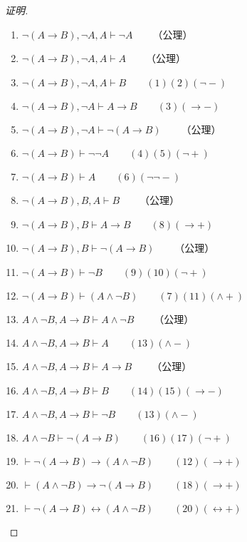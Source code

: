 \documentclass{article}
\begin{document}
\begin{CJK*}{UTF8}{gbsn}
\begin{proof}[证明]
      \begin{enumerate}
        \item $\lnot(A\to B), \lnot A, A\vdash \lnot A\qquad $（公理）
        \item $\lnot(A\to B), \lnot A, A\vdash A\qquad $（公理）
        \item $\lnot(A\to B), \lnot A, A\vdash B\qquad (1)(2)(\lnot -)$
        \item $\lnot(A\to B), \lnot A\vdash A\to B\qquad (3)(\to -)$
        \item $\lnot(A\to B), \lnot A\vdash \lnot(A\to B)\qquad $（公理）
        \item $\lnot(A\to B)\vdash \lnot\lnot A\qquad (4)(5)(\lnot +)$
        \item $\lnot(A\to B)\vdash A\qquad (6)(\lnot\lnot-)$
        \item $\lnot(A\to B), B, A\vdash B \qquad $（公理）
        \item $\lnot(A\to B), B\vdash A\to B \qquad (8)(\to +)$
        \item $\lnot(A\to B), B\vdash \lnot(A\to B) \qquad $（公理）
        \item $\lnot(A\to B)\vdash \lnot B \qquad (9)(10)(\lnot +)$
        \item $\lnot(A\to B)\vdash (A\land \lnot B) \qquad (7)(11)(\land +)$
        \item $A\land \lnot B, A\to B\vdash A\land \lnot B\qquad$（公理）
        \item $A\land \lnot B, A\to B\vdash A\qquad(13)(\land -)$
        \item $A\land \lnot B, A\to B\vdash A\to B\qquad$（公理）
        \item $A\land \lnot B, A\to B\vdash B\qquad(14)(15)(\to -)$
        \item $A\land \lnot B, A\to B\vdash \lnot B\qquad(13)(\land -)$
        \item $A\land \lnot B\vdash \lnot(A\to B) \qquad(16)(17)(\lnot +)$
        \item $\vdash \lnot(A\to B)\to (A\land \lnot B) \qquad (12)(\to +)$
        \item $\vdash (A\land \lnot B)\to \lnot(A\to B) \qquad(18)(\to +)$
        \item $\vdash \lnot (A\to B)\leftrightarrow (A\land \lnot B) \qquad(20)(\leftrightarrow +)$
      \end{enumerate}

    \end{proof}
    

\end{CJK*}
\end{document}
